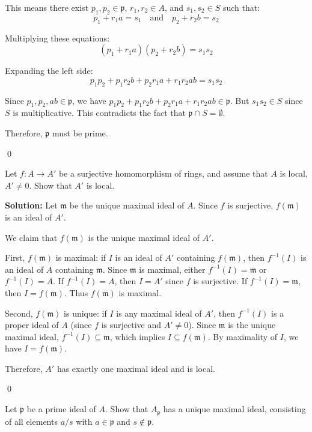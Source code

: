 This means there exist $p_1, p_2 \in \mathfrak{p}$, $r_1, r_2 \in A$, and $s_1, s_2 \in S$ such that:
\[ p_1 + r_1a = s_1 \quad \text{and} \quad p_2 + r_2b = s_2 \]

Multiplying these equations:
\[ (p_1 + r_1a)(p_2 + r_2b) = s_1s_2 \]

Expanding the left side:
\[ p_1p_2 + p_1r_2b + p_2r_1a + r_1r_2ab = s_1s_2 \]

Since $p_1, p_2, ab \in \mathfrak{p}$, we have $p_1p_2 + p_1r_2b + p_2r_1a + r_1r_2ab \in \mathfrak{p}$. But $s_1s_2 \in S$ since $S$ is multiplicative. This contradicts the fact that $\mathfrak{p} \cap S = \emptyset$.

Therefore, $\mathfrak{p}$ must be prime.


\qed
\begin{problembox}
Let $f: A \rightarrow A'$ be a surjective homomorphism of rings, and assume that $A$ is local, $A' \neq 0$. Show that $A'$ is local.
\end{problembox}

\noindent\textbf{Solution:}
Let $\mathfrak{m}$ be the unique maximal ideal of $A$. Since $f$ is surjective, $f(\mathfrak{m})$ is an ideal of $A'$.

We claim that $f(\mathfrak{m})$ is the unique maximal ideal of $A'$.

First, $f(\mathfrak{m})$ is maximal: if $I$ is an ideal of $A'$ containing $f(\mathfrak{m})$, then $f^{-1}(I)$ is an ideal of $A$ containing $\mathfrak{m}$. Since $\mathfrak{m}$ is maximal, either $f^{-1}(I) = \mathfrak{m}$ or $f^{-1}(I) = A$. If $f^{-1}(I) = A$, then $I = A'$ since $f$ is surjective. If $f^{-1}(I) = \mathfrak{m}$, then $I = f(\mathfrak{m})$. Thus $f(\mathfrak{m})$ is maximal.

Second, $f(\mathfrak{m})$ is unique: if $I$ is any maximal ideal of $A'$, then $f^{-1}(I)$ is a proper ideal of $A$ (since $f$ is surjective and $A' \neq 0$). Since $\mathfrak{m}$ is the unique maximal ideal, $f^{-1}(I) \subseteq \mathfrak{m}$, which implies $I \subseteq f(\mathfrak{m})$. By maximality of $I$, we have $I = f(\mathfrak{m})$.

Therefore, $A'$ has exactly one maximal ideal and is local.


\qed
\begin{problembox}
Let $\mathfrak{p}$ be a prime ideal of $A$. Show that $A_{\mathfrak{p}}$ has a unique maximal ideal, consisting of all elements $a/s$ with $a \in \mathfrak{p}$ and $s \notin \mathfrak{p}$.
\end{problembox}

